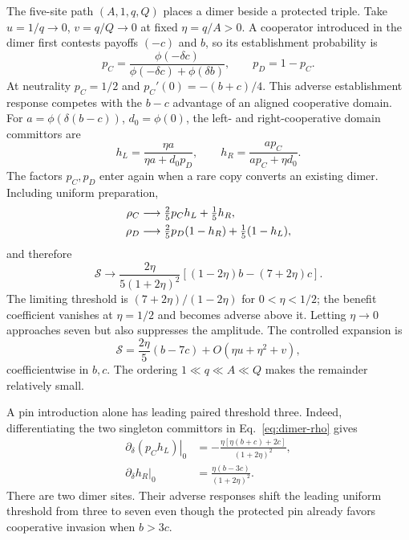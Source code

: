 \documentclass[aps,pre,reprint,amsmath,amssymb,longbibliography]{revtex4-2}
\begin{document}
The five-site path $(A,1,q,Q)$ places a dimer beside a protected triple.
Take $u=1/q\to0$, $v=q/Q\to0$ at fixed $\eta=q/A>0$.
A cooperator introduced in the dimer first contests payoffs $(-c)$ and $b$,
so its establishment probability is
\begin{equation}
 p_C=\frac{\phi(-\delta c)}
 {\phi(-\delta c)+\phi(\delta b)},\qquad p_D=1-p_C .
 \label{eq:dimer-establishment}
\end{equation}
At neutrality $p_C=1/2$ and $p_C'(0)=-(b+c)/4$. This adverse
establishment response competes with the $b-c$ advantage of an aligned
cooperative domain. For $a=\phi(\delta(b-c))$, $d_0=\phi(0)$, the
left- and right-cooperative domain committors are
\begin{equation}
 h_L=\frac{\eta a}{\eta a+d_0 p_D},\qquad
 h_R=\frac{a p_C}{a p_C+\eta d_0}.
 \label{eq:dimer-slow-h}
\end{equation}
The factors $p_C,p_D$ enter again when a rare copy converts an existing
dimer. Including uniform preparation,
\begin{align}
 \rho_C&\longrightarrow\tfrac25p_Ch_L+\tfrac15h_R,\notag\\
 \rho_D&\longrightarrow\tfrac25p_D(1-h_R)+\tfrac15(1-h_L),
 \label{eq:dimer-rho}
\end{align}
and therefore
\begin{equation}
 \mathcal S\longrightarrow
 \frac{2\eta}{5(1+2\eta)^2}
 [(1-2\eta)b-(7+2\eta)c].
 \label{eq:dimer-response}
\end{equation}
The limiting threshold is $(7+2\eta)/(1-2\eta)$ for $0<\eta<1/2$;
the benefit coefficient vanishes at $\eta=1/2$ and becomes adverse
above it. Letting $\eta\to0$ approaches seven but also suppresses
the amplitude. The controlled expansion is
\begin{equation}
 \mathcal S=\frac{2\eta}{5}(b-7c)
           +O(\eta u+\eta^2+v),
 \label{eq:dimer-uniform}
\end{equation}
coefficientwise in $b,c$. The ordering $1\ll q\ll A\ll Q$ makes
the remainder relatively small. 

A pin introduction alone has leading paired threshold three. Indeed,
differentiating the two singleton committors in
Eq.~\eqref{eq:dimer-rho} gives
\begin{equation}
 \begin{aligned}
 \left.\partial_\delta(p_Ch_L)\right|_0
 &=-\frac{\eta[\eta(b+c)+2c]}{(1+2\eta)^2},\\
 \left.\partial_\delta h_R\right|_0
 &=\frac{\eta(b-3c)}{(1+2\eta)^2}.
 \end{aligned}
 \label{eq:p5-site-cancellation}
\end{equation}
There are two dimer sites. Their adverse responses shift the leading
uniform threshold from three to seven even though the protected pin
already favors cooperative invasion when $b>3c$.
\end{document}

